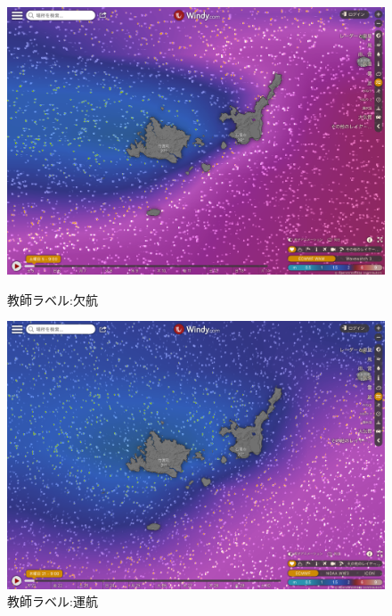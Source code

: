 \begin{figure}[H]
 \begin{minipage}{0.5\hsize}
  \begin{center}
   \includegraphics[keepaspectratio, scale=0.16]{fig/chapter4/wave_hatoma_0/FN_setu.png}
  \end{center}
  \caption{教師ラベル:欠航}
  \label{hatoma_0_FN_setu}
 \end{minipage}
 \begin{minipage}{0.5\hsize}
  \begin{center}
  \includegraphics[keepaspectratio, scale=0.16]{fig/chapter4/wave_hatoma_0/unkou_FP_setu.png}
  \end{center}
   \caption{教師ラベル:運航}
  \label{hatoma_0_FP_setu}
 \end{minipage}
\end{figure}

